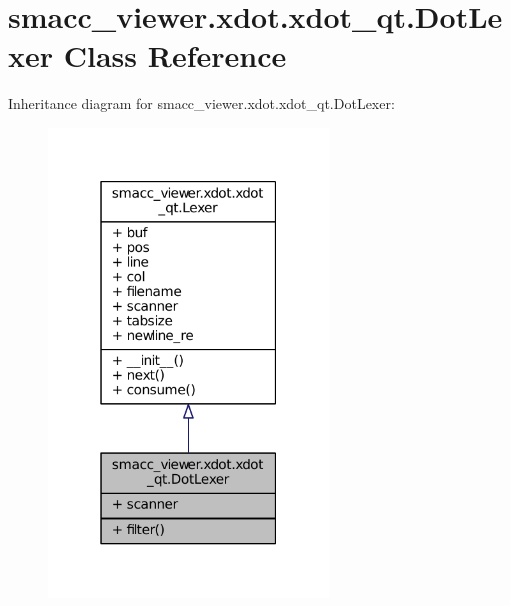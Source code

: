 \hypertarget{classsmacc__viewer_1_1xdot_1_1xdot__qt_1_1DotLexer}{}\section{smacc\+\_\+viewer.\+xdot.\+xdot\+\_\+qt.\+Dot\+Lexer Class Reference}
\label{classsmacc__viewer_1_1xdot_1_1xdot__qt_1_1DotLexer}


Inheritance diagram for smacc\+\_\+viewer.\+xdot.\+xdot\+\_\+qt.\+Dot\+Lexer\+:
\nopagebreak
\begin{figure}[H]
\begin{center}
\leavevmode
\includegraphics[width=211pt]{classsmacc__viewer_1_1xdot_1_1xdot__qt_1_1DotLexer__inherit__graph}
\end{center}
\end{figure}


